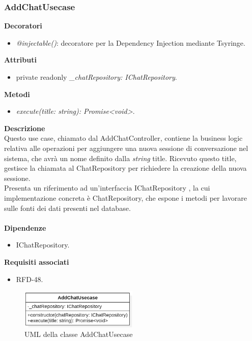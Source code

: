 \subsubsection{AddChatUsecase}
\textbf{Decoratori}
\begin{itemize}
    \item \textit{@injectable()}: decoratore per la Dependency Injection mediante Tsyringe.
\end{itemize}
\textbf{Attributi}
\begin{itemize}
    \item private readonly \textit{\_chatRepository: IChatRepository}.
\end{itemize}
\textbf{Metodi}
\begin{itemize}
    \item \textit{execute(title: string): Promise<void>}.
\end{itemize}
\textbf{Descrizione}\\
Questo use case, chiamato dal AddChatController, contiene la business logic relativa alle operazioni per aggiungere una nuova sessione di conversazione nel sistema, che avrà un nome definito dalla \textit{string} title. Ricevuto questo title, gestisce la chiamata al ChatRepository per richiedere la creazione della nuova sessione.\\
Presenta un riferimento ad un'interfaccia IChatRepository , la cui implementazione concreta è ChatRepository, che espone i metodi per lavorare sulle fonti dei dati presenti nel database.\\ \\
\textbf{Dipendenze}
\begin{itemize}
    \item IChatRepository.
\end{itemize}
\textbf{Requisiti associati}
\begin{itemize}
    \item RFD-48.
\end{itemize}

\begin{figure}[h!]
    \centering  
    \includegraphics[width=0.5\textwidth]{AddChatUsecase.png}
    \caption{UML della classe AddChatUsecase}
\end{figure}

